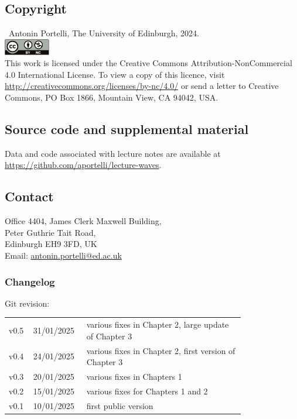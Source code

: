 \documentclass[a4paper,12pt]{book}
\theoremstyle{plain}
\theoremstyle{plain}
\theoremstyle{plain}
\theoremstyle{plain}
\theoremstyle{definition}
\theoremstyle{definition}
\begin{document}
{ \footnotesize %
  \subsection*{Copyright}
  \textcopyright~Antonin Portelli, The University of Edinburgh, 2024.
  \vspace*{10pt}\\
  \noindent\includegraphics[width=2cm]{by-nc.pdf}\\
  This work is licensed under the Creative Commons
  Attribution-NonCommercial 4.0 International
  License. To view a copy of this licence, visit
  \url{http://creativecommons.org/licenses/by-nc/4.0/} or send a
  letter to Creative Commons, PO
  Box 1866, Mountain View, CA 94042, USA.

  \subsection*{Source code and supplemental material}
  Data and code associated with lecture notes are available at
  \url{https://github.com/aportelli/lecture-waves}.

  \subsection*{Contact}
  Office 4404, James Clerk Maxwell Building,\\
  Peter Guthrie Tait Road,\\
  Edinburgh EH9 3FD, UK\\
  Email: \href{mailto:antonin.portelli@ed.ac.uk}{antonin.portelli@ed.ac.uk}

  \vfill
  \subsubsection*{Changelog}
  \scriptsize
  Git revision: \gitDescribe\vspace*{0.2cm}\\
  \begin{tabular}{@{} L{0.05\linewidth} L{0.15\linewidth} L{0.6\linewidth} @{}}
    \toprule
    v0.5 & 31/01/2025 & various fixes in Chapter 2, large update of Chapter 3\\
    v0.4 & 24/01/2025 & various fixes in Chapter 2, first version of Chapter 3\\
    v0.3 & 20/01/2025 & various fixes in Chapters 1\\
    v0.2 & 15/01/2025 & various fixes for Chapters 1 and 2\\
    v0.1 & 10/01/2025 & first public version\\
    \bottomrule
  \end{tabular}
}
\end{document}
